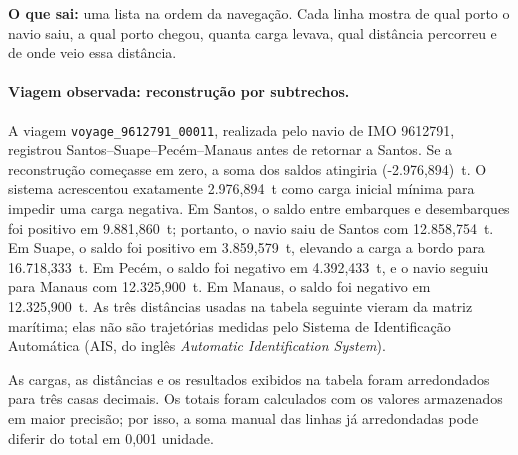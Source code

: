 \documentclass[12pt,a4paper]{article}
\begin{document}
\textbf{O que sai:} uma lista na ordem da navegação. Cada linha mostra de qual porto o navio saiu, a qual porto chegou, quanta carga levava, qual distância percorreu e de onde veio essa distância.

\paragraph{Viagem observada: reconstrução por subtrechos.}
A viagem \nolinkurl{voyage_9612791_00011}, realizada pelo navio de IMO 9612791, registrou Santos--Suape--Pecém--Manaus antes de retornar a Santos. Se a reconstrução começasse em zero, a soma dos saldos atingiria (-2.976{,}894)~t. O sistema acrescentou exatamente 2.976,894~t como carga inicial mínima para impedir uma carga negativa. Em Santos, o saldo entre embarques e desembarques foi positivo em 9.881,860~t; portanto, o navio saiu de Santos com 12.858,754~t. Em Suape, o saldo foi positivo em 3.859,579~t, elevando a carga a bordo para 16.718,333~t. Em Pecém, o saldo foi negativo em 4.392,433~t, e o navio seguiu para Manaus com 12.325,900~t. Em Manaus, o saldo foi negativo em 12.325,900~t. As três distâncias usadas na tabela seguinte vieram da matriz marítima; elas não são trajetórias medidas pelo Sistema de Identificação Automática (AIS, do inglês \emph{Automatic Identification System}).

\begin{table}[htbp]
\centering
\small
\caption{Carga, distância, trabalho de transporte e combustível reconstruídos na viagem \texttt{voyage\_9612791\_00011}.}
\label{tab:exemplo-subtrechos}
\end{table}

As cargas, as distâncias e os resultados exibidos na tabela foram arredondados para três casas decimais. Os totais foram calculados com os valores armazenados em maior precisão; por isso, a soma manual das linhas já arredondadas pode diferir do total em 0,001 unidade.
\end{document}
